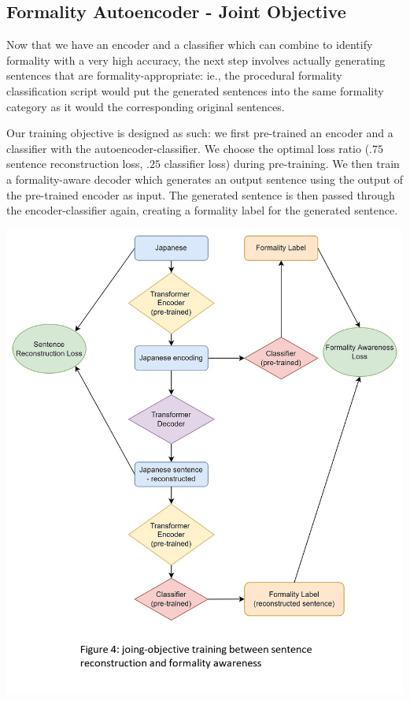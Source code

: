 \documentclass[11pt]{article}
\begin{document}
\subsection{Formality Autoencoder - Joint Objective}

Now that we have an encoder and a classifier which can combine to identify formality with a very high accuracy, the next step involves actually generating sentences that are formality-appropriate: ie., the procedural formality classification script would put the generated sentences into the same formality category as it would the corresponding original sentences.

Our training objective is designed as such: we first pre-trained an encoder and a classifier with the autoencoder-classifier. We choose the optimal loss ratio ($.75$ sentence reconstruction loss, $.25$ classifier loss) during pre-training. We then train a formality-aware decoder which generates an output sentence using the output of the pre-trained encoder as input. The generated sentence is then passed through the encoder-classifier again, creating a formality label for the generated sentence.

\includegraphics{images/joint_objective.jpg}
\end{document}
